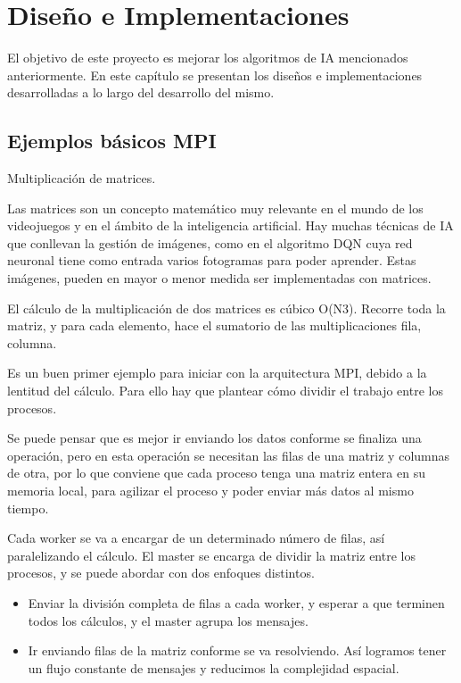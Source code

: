 

\chapter{Diseño e Implementaciones}
	
El objetivo de este proyecto es mejorar los algoritmos de IA mencionados anteriormente. En este capítulo se presentan los diseños e implementaciones desarrolladas a lo largo del desarrollo del mismo.

\section{Ejemplos básicos MPI}
\noindent Multiplicación de matrices. 


Las matrices son un concepto matemático muy relevante en el mundo de los videojuegos y en el ámbito de la inteligencia artificial. Hay muchas técnicas de IA que conllevan la gestión de imágenes, como en el algoritmo DQN cuya red neuronal tiene como entrada varios fotogramas para poder aprender. Estas imágenes, pueden en mayor o menor medida ser implementadas con matrices.

El cálculo de la multiplicación de dos matrices es cúbico O(N3). Recorre toda la matriz, y para cada elemento, hace el sumatorio de las multiplicaciones fila, columna. 

Es un buen primer ejemplo para iniciar con la arquitectura MPI, debido a la lentitud del cálculo. Para ello hay que plantear cómo dividir el trabajo entre los procesos. 

Se puede pensar que es mejor ir enviando los datos conforme se finaliza una operación, pero en esta operación se necesitan las filas de una matriz y columnas de otra, por lo que conviene que cada proceso tenga una matriz entera en su memoria local, para agilizar el proceso y poder enviar más datos al mismo tiempo.


Cada worker se va a encargar de un determinado número de filas, así paralelizando el cálculo. El master se encarga de dividir la matriz entre los procesos, y se puede abordar con dos enfoques distintos.
\begin{itemize}
	\item Enviar la división completa de filas a cada worker, y esperar a que terminen todos los cálculos, y el master agrupa los mensajes. 
	\item Ir enviando filas de la matriz conforme se va resolviendo. Así logramos tener un flujo constante de mensajes y reducimos la complejidad espacial.
\end{itemize}

